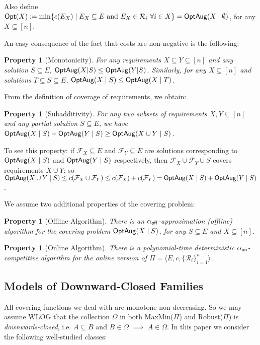 \documentclass[11pt,letterpaper]{article}
\newtheorem{property}[theorem]{Property}
\def\f{\ensuremath {\mathcal{F}}\xspace}
\def\opt{{\sf Opt}\xspace}
\def\cov{\ensuremath{\Pi}\xspace}
\def\rcov{{\sf Robust(\cov)}\xspace}
\def\mmp{{\sf MaxMin(\cov)}\xspace}
\newcommand{\sse}{\subseteq}
\newcommand{\offline}{\alpha_{\sf off}}
\newcommand{\online}{\alpha_{\sf on}}
\newcommand{\optaug}{{\sf OptAug}}
\begin{document}
Also define $\opt(X) := \min \{c(E_X)\mid E_X \sse E \text{ and } E_X\in \mathcal{R}_i~\forall i\in
X\}=\optaug(X\mid\emptyset)$, for any $X\sse [n]$.

An easy consequence of the fact that costs are non-negative is the following:
\begin{property}[Monotonicity]\label{ass:monotone}
For any requirements $X\sse Y\sse [n]$ and any solution $S\sse E$, $\optaug(X|S)\le \optaug(Y|S)$. Similarly, for any
$X\sse [n]$ and solutions $T\sse S\sse E$, $\optaug(X\mid S) \le \optaug(X\mid T)$.
\end{property}

From the definition of coverage of requirements, we obtain:
\begin{property}[Subadditivity]\label{ass:subadd}
  For any two subsets of requirements $X,Y\sse [n]$ and any partial
  solution $S\sse E$, we have $\optaug(X\mid S) + \optaug(Y\mid S)\ge
  \optaug(X\cup Y\mid S)$.
\end{property}
To see this property: if $\f_X\sse E$ and $\f_Y\sse E$ are solutions corresponding to $\optaug(X\mid S)$ and
$\optaug(Y\mid S)$ respectively, then  $\f_X\cup\f_Y\cup S$ covers requirements $X\cup Y$; so $\optaug(X\cup Y\mid S)
\le c(\f_X\cup \f_Y)\le c(\f_X)+c(\f_Y) = \optaug(X\mid S) + \optaug(Y\mid S)$.

We assume two additional properties of the covering problem:
\begin{property}[Offline Algorithm]\label{ass:apx}
  There is an $\offline$-approximation (offline) algorithm for the
  covering problem $\optaug(X\mid S)$, for any $S\sse E$ and $X\sse [n]$.
\end{property}
\begin{property}[Online Algorithm]\label{ass:online}
  There is a polynomial-time deterministic $\online$-competitive algorithm for the online
  version of $\cov = \langle E,c, \{\mathcal{R}_i\}_{i=1}^n\rangle$.\end{property}


\subsection{Models of Downward-Closed Families}
All covering functions we deal with are monotone non-decreasing. So we
may assume WLOG that the collection $\Omega$ in both \mmp and \rcov is
\emph{downwards-closed}, i.e. $A\sse B$ and $B\in\Omega$ $\implies$
$A\in\Omega$. In this paper we consider the following well-studied
classes:
\end{document}
